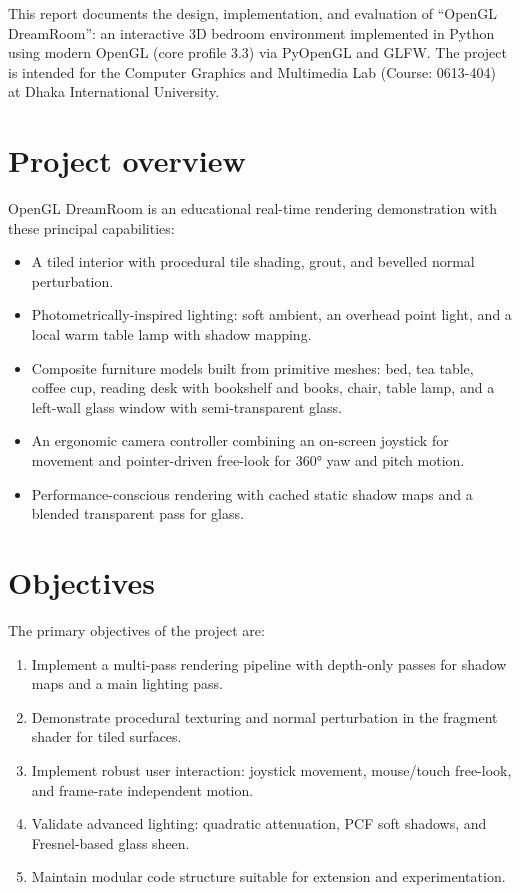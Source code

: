 \documentclass[12pt,a4paper]{report}
\begin{document}
This report documents the design, implementation, and evaluation of ``OpenGL DreamRoom'': an interactive 3D bedroom environment implemented in Python using modern OpenGL (core profile 3.3) via PyOpenGL and GLFW. The project is intended for the Computer Graphics and Multimedia Lab (Course: 0613-404) at Dhaka International University.

\section{Project overview}
OpenGL DreamRoom is an educational real-time rendering demonstration with these principal capabilities:
\begin{itemize}
  \item A tiled interior with procedural tile shading, grout, and bevelled normal perturbation.
  \item Photometrically-inspired lighting: soft ambient, an overhead point light, and a local warm table lamp with shadow mapping.
  \item Composite furniture models built from primitive meshes: bed, tea table, coffee cup, reading desk with bookshelf and books, chair, table lamp, and a left-wall glass window with semi-transparent glass.
  \item An ergonomic camera controller combining an on-screen joystick for movement and pointer-driven free-look for 360° yaw and pitch motion.
  \item Performance-conscious rendering with cached static shadow maps and a blended transparent pass for glass.
\end{itemize}

\section{Objectives}
The primary objectives of the project are:
\begin{enumerate}
  \item Implement a multi-pass rendering pipeline with depth-only passes for shadow maps and a main lighting pass.
  \item Demonstrate procedural texturing and normal perturbation in the fragment shader for tiled surfaces.
  \item Implement robust user interaction: joystick movement, mouse/touch free-look, and frame-rate independent motion.
  \item Validate advanced lighting: quadratic attenuation, PCF soft shadows, and Fresnel-based glass sheen.
  \item Maintain modular code structure suitable for extension and experimentation.
\end{enumerate}
\end{document}
